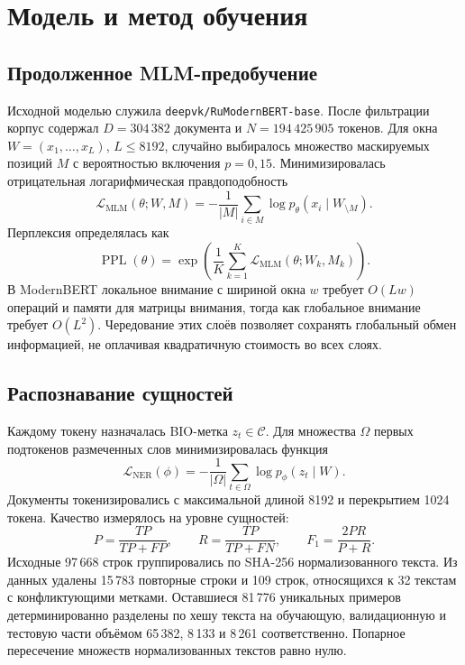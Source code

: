 \documentclass[12pt,a4paper]{article}
\begin{document}
\section{Модель и метод обучения}
\subsection{Продолженное MLM-предобучение}
Исходной моделью служила \texttt{deepvk/RuModernBERT-base}. После фильтрации корпус содержал $D=304\,382$ документа и $N=194\,425\,905$ токенов. Для окна $W=(x_1,\ldots,x_L)$, $L\leq8192$, случайно выбиралось множество маскируемых позиций $M$ с вероятностью включения $p=0{,}15$. Минимизировалась отрицательная логарифмическая правдоподобность
\begin{equation}
 \mathcal L_{\mathrm{MLM}}(\theta;W,M)=-\frac{1}{|M|}\sum_{i\in M}\log p_\theta(x_i\mid W_{\setminus M}).
 \label{eq:mlm}
\end{equation}
Перплексия определялась как
\begin{equation}
 \operatorname{PPL}(\theta)=\exp\!\left(\frac{1}{K}\sum_{k=1}^{K}\mathcal L_{\mathrm{MLM}}(\theta;W_k,M_k)\right).
 \label{eq:ppl}
\end{equation}
В ModernBERT локальное внимание с шириной окна $w$ требует $O(Lw)$ операций и памяти для матрицы внимания, тогда как глобальное внимание требует $O(L^2)$. Чередование этих слоёв позволяет сохранять глобальный обмен информацией, не оплачивая квадратичную стоимость во всех слоях.

\subsection{Распознавание сущностей}
Каждому токену назначалась BIO-метка $z_t\in\mathcal C$. Для множества $\Omega$ первых подтокенов размеченных слов минимизировалась функция
\begin{equation}
 \mathcal L_{\mathrm{NER}}(\phi)=-\frac{1}{|\Omega|}\sum_{t\in\Omega}\log p_\phi(z_t\mid W).
 \label{eq:ner}
\end{equation}
Документы токенизировались с максимальной длиной 8192 и перекрытием 1024 токена. Качество измерялось на уровне сущностей:
\begin{equation}
 P=\frac{TP}{TP+FP},\qquad R=\frac{TP}{TP+FN},\qquad F_1=\frac{2PR}{P+R}.
 \label{eq:f1}
\end{equation}
Исходные 97\,668 строк группировались по SHA-256 нормализованного текста. Из данных удалены 15\,783 повторные строки и 109 строк, относящихся к 32 текстам с конфликтующими метками. Оставшиеся 81\,776 уникальных примеров детерминированно разделены по хешу текста на обучающую, валидационную и тестовую части объёмом 65\,382, 8\,133 и 8\,261 соответственно. Попарное пересечение множеств нормализованных текстов равно нулю.
\end{document}
